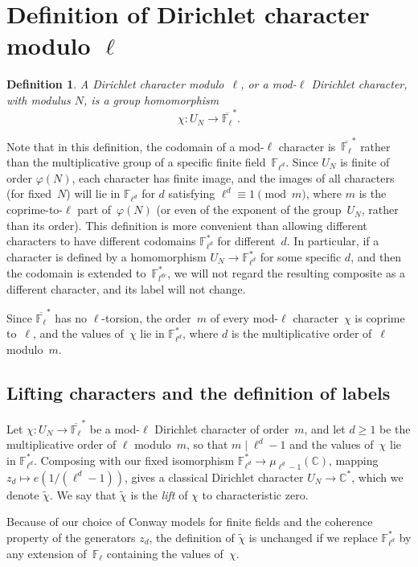\documentclass[a4paper, 10pt]{amsart}
\newtheorem{defn}{Definition}%
\def\C{{\mathbb C}}
\def\F{{\mathbb F}}
\def\Fl{{\mathbb F}_{\ell}}
\def\Fld{{\mathbb F}_{\ell^d}}
\def\Flbar{\overline{{\mathbb F}_{\ell}}}
\begin{document}
\section{Definition of Dirichlet character modulo $\ell$}

\begin{defn} A \emph{Dirichlet character modulo~$\ell$}, or a
  \emph{mod-$\ell$ Dirichlet character}, with modulus $N$, is a group
  homomorphism
  \[
  \chi:   U_N \to \Flbar^*.
  \]
\end{defn}
Note that in this definition, the codomain of a mod-$\ell$ character
is~$\Flbar^*$ rather than the multiplicative group of a specific
finite field~$\Fld$.  Since $ U_N$ is finite of order $\varphi(N)$,
each character has finite image, and the images of all characters (for
fixed~$N$) will lie in $\Fld$ for $d$ satisfying
$\ell^d\equiv1\pmod{m}$, where $m$ is the coprime-to-$\ell$ part
of~$\varphi(N)$ (or even of the exponent of the group~$ U_N$, rather
than its order).  This definition is more convenient than allowing
different characters to have different codomains $\Fld^*$ for
different~$d$.  In particular, if a character is defined by a
homomorphism $ U_N\to\Fld^*$ for some specific $d$, and then the
codomain is extended to~$\F_{l^{de}}^*$, we will not regard the
resulting composite as a different character, and its label will not
change.

Since $\Flbar^*$ has no $\ell$-torsion, the order~$m$ of every
mod-$\ell$ character~$\chi$ is coprime to~$\ell$, and the values
of~$\chi$ lie in $\Fld^*$, where $d$ is the multiplicative order
of~$\ell$ modulo~$m$.

\subsection{Lifting characters and the definition of labels}

Let $\chi:  U_N \to \Flbar^*$ be a mod-$\ell$ Dirichlet character
of order~$m$, and let $d\ge1$ be the multiplicative order of $\ell$
modulo~$m$, so that $m\mid\ell^d-1$ and the values of~$\chi$ lie in
$\Fld^*$.  Composing with our fixed isomorphism $\Fld^* \to
\mu_{\ell^d-1}(\C)$, mapping $z_d\mapsto e(1/(\ell^d-1))$, gives a
classical Dirichlet character $ U_N\to\C^*$, which we denote
$\tilde{\chi}$.  We say that $\tilde{\chi}$ is the \emph{lift} of
$\chi$ to characteristic zero.

Because of our choice of Conway models for finite fields and the
coherence property of the generators $z_d$, the definition of
$\tilde{\chi}$ is unchanged if we replace $\Fld^*$ by any extension
of~$\Fl$ containing the values of~$\chi$.
\end{document}
